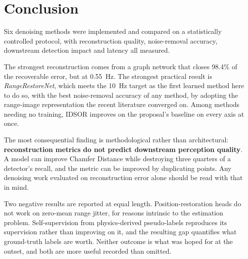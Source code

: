 \documentclass[11pt,a4paper]{article}
\begin{document}
\section{Conclusion}

Six denoising methods were implemented and compared on a statistically
controlled protocol, with reconstruction quality, noise-removal accuracy,
downstream detection impact and latency all measured.

The strongest reconstruction comes from a graph network that closes 98.4\% of
the recoverable error, but at 0.55~Hz. The strongest practical result is
\emph{RangeRestoreNet}, which meets the 10~Hz target as the first learned
method here to do so, with the best noise-removal accuracy of any method,
by adopting the range-image representation the recent literature converged
on. Among methods needing no training, IDSOR improves on the proposal's
baseline on every axis at once.

The most consequential finding is methodological rather than architectural:
\textbf{reconstruction metrics do not predict downstream perception
quality}. A model can improve Chamfer Distance while destroying three
quarters of a detector's recall, and the metric can be improved by
duplicating points. Any denoising work evaluated on reconstruction error
alone should be read with that in mind.

Two negative results are reported at equal length. Position-restoration heads
do not work on zero-mean range jitter, for reasons intrinsic to the
estimation problem. Self-supervision from physics-derived pseudo-labels
reproduces its supervision rather than improving on it, and the resulting gap
quantifies what ground-truth labels are worth. Neither outcome is what was
hoped for at the outset, and both are more useful recorded than omitted.
\end{document}
